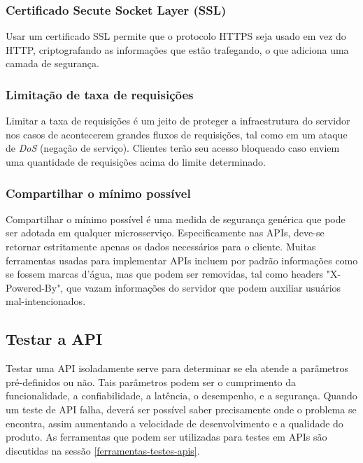 \subsubsection*{Certificado Secute Socket Layer (SSL)}
Usar um certificado SSL permite que o protocolo HTTPS seja usado em vez do HTTP, criptografando as informações que estão trafegando, o que adiciona uma camada de segurança. \cite{rapidAPI-twitter}

\subsubsection*{Limitação de taxa de requisições}
Limitar a taxa de requisições é um jeito de proteger a infraestrutura do servidor nos casos de acontecerem grandes fluxos de requisições, tal como em um ataque de \emph{DoS} (negação de serviço). Clientes terão seu acesso bloqueado caso enviem uma quantidade de requisições acima do limite determinado. \cite{rapidAPI-twitter}

\subsubsection*{Compartilhar o mínimo possível}
Compartilhar o mínimo possível é uma medida de segurança genérica que pode ser adotada em qualquer microsserviço. Especificamente nas APIs, deve-se retornar estritamente apenas os dados necessários para o cliente. Muitas ferramentas usadas para implementar APIs incluem por padrão informações como se fossem marcas d'água, mas que podem ser removidas, tal como headers "X-Powered-By", que vazam informações do servidor que podem auxiliar usuários mal-intencionados. \cite{rapidAPI-twitter}

\subsection{Testar a API}
Testar uma API isoladamente serve para determinar se ela atende a parâmetros pré-definidos ou não. Tais parâmetros podem ser o cumprimento da funcionalidade, a confiabilidade, a latência, o desempenho, e a segurança. Quando um teste de API falha, deverá ser possível saber precisamente onde o problema se encontra, assim aumentando a velocidade de desenvolvimento e a qualidade do produto. As ferramentas que podem ser utilizadas para testes em APIs são discutidas na sessão \autoref{ferramentas-testes-apis}.


